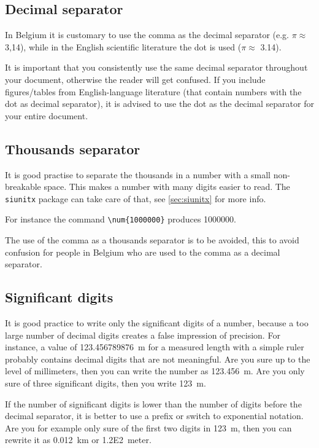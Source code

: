 \subsection{Decimal separator}
In Belgium it is customary to use the comma as the decimal separator (e.g. $\pi\approx$ 3,14), while in the English scientific literature the dot is used ($\pi\approx$ 3.14). 

It is important that you consistently use the same decimal separator throughout your document, otherwise the reader will get confused. If you include figures/tables from English-language literature (that contain numbers with the dot as decimal separator), it is advised to use the dot as the decimal separator for your entire document.

\subsection{Thousands separator}
It is good practise to separate the thousands in a number with a small non-breakable space. This makes a number with many digits easier to read. The \verb|siunitx| package can take care of that, see \cref{sec:siunitx} for more info.

For instance the command \verb|\num{1000000}| produces \num{1000000}. 

The use of the comma as a thousands separator is to be avoided, this to avoid confusion for people in Belgium who are used to the comma as a decimal separator.

\subsection{Significant digits}
It is good practice to write only the significant digits of a number, because a too large number of decimal digits creates a false impression of precision. For instance, a value of 123.456789876~m for a measured length with a simple ruler probably contains decimal digits that are not meaningful. Are you sure up to the level of millimeters, then you can write the number as \SI{123.456}{\meter}. Are you only sure of three significant digits, then you write \SI{123}{\meter}.

If the number of significant digits is lower than the number of digits before the decimal separator, it is better to use a prefix or switch to exponential notation. Are you for example only sure of the first two digits in \SI{123}{\meter}, then you can rewrite it as \SI{0.012}{km} or \SI{1.2E2}{meter}.

